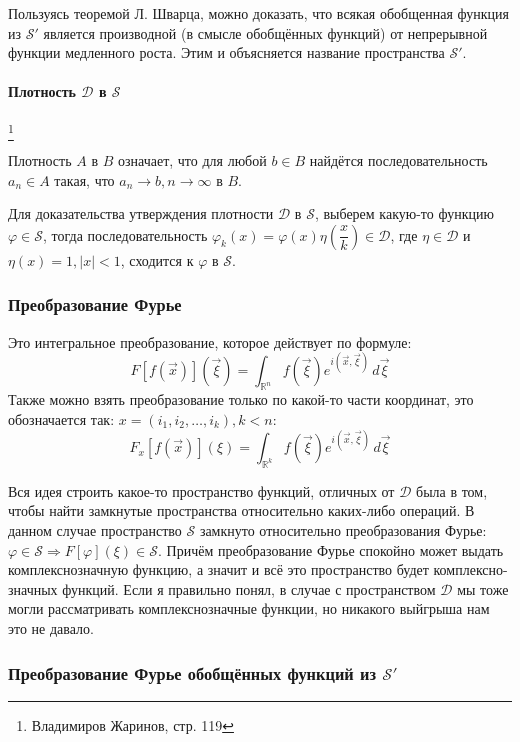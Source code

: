 Пользуясь теоремой Л. Шварца, можно доказать, что всякая обобщенная функция из $\mathcal{S}'$
является производной (в смысле обобщённых функций) от непрерывной функции медленного роста. Этим и
объясняется название пространства $\mathcal{S}'$.

\paragraph{Плотность $\mathcal{D}$ в $\mathcal{S}$}\footnote{Владимиров Жаринов, стр. 119}

Плотность $A$ в $B$ означает, что для любой $b \in B$ найдётся последовательность $a_n \in A$ такая,
что $a_n \to b, n \to \infty$ в $B$.

Для доказательства утверждения плотности $\mathcal{D}$ в $\mathcal{S}$, выберем какую-то функцию
$\varphi \in \mathcal{S}$, тогда последовательность
$\varphi_k(x) = \varphi(x) \eta(\dfrac{x}{k}) \in \mathcal{D}$, где $\eta \in \mathcal{D}$ и
$\eta(x) = 1, |x| < 1$, сходится к $\varphi$ в $\mathcal{S}$.

\subsubsection{Преобразование Фурье}

Это интегральное преобразование, которое действует по формуле:
\[
  F[f(\vec{x})](\vec{\xi}) = \int_{\mathbb{R}^n} f(\vec{\xi}) e^{i (\vec{x},\vec{\xi})} \, d\vec{\xi}
\]
Также можно взять преобразование только по какой-то части координат, это обозначается так:
$x = (i_1, i_2, \dots, i_k), k < n$:
\[
  F_x [f(\vec{x})] (\xi) = \int_{\mathbb{R}^k} f(\vec{\xi}) e^{i (\vec{x}, \vec{\xi})} \, d\vec{\xi}
\]

Вся идея строить какое-то пространство функций, отличных от $\mathcal{D}$ была в том, чтобы найти 
замкнутые пространства относительно каких-либо операций. В данном случае пространство $\mathcal{S}$
замкнуто относительно преобразования Фурье: $\varphi \in \mathcal{S} \Rightarrow 
F[\varphi] (\xi) \in \mathcal{S}$. Причём преобразование Фурье спокойно может выдать
комплекснозначную функцию, а значит и всё это пространство будет комплексно-значных функций.
Если я правильно понял, в случае с пространством $\mathcal{D}$ мы тоже могли рассматривать
комплекснозначные функции, но никакого выйгрыша нам это не давало.

\subsubsection{Преобразование Фурье обобщённых функций из $\mathcal{S}'$}

